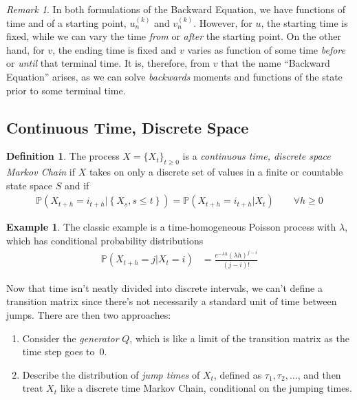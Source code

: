 \documentclass[12pt]{article}
\theoremstyle{plain}
\theoremstyle{definition}
\newtheorem{defn}[thm]{Definition}
\newtheorem{ex}[thm]{Example}
\theoremstyle{remark}
\newtheorem*{rmk}{Remark}
\begin{document}
\begin{rmk}
In both formulations of the Backward Equation, we have functions of time
and of a starting point, $u^{(k)}_n$ and $v^{(k)}_n$. However, for $u$,
the starting time is fixed, while we can vary the time \emph{from} or
\emph{after} the starting point. On the other hand, for $v$, the ending
time is fixed and $v$ varies as function of some time \emph{before} or
\emph{until} that terminal time. It is, therefore, from $v$ that the
name ``Backward Equation'' arises, as we can solve \emph{backwards}
moments and functions of the state prior to some terminal time.
\end{rmk}

\subsection{Continuous Time, Discrete Space}

\begin{defn}
The process $X=\{X_t\}_{t\geq 0}$ is a \emph{continuous time, discrete
space Markov Chain} if $X$ takes on only a discrete set of values in a
finite or countable state space $S$ and if
\begin{align*}
  \mathbb{P}\left(X_{t+h} = i_{t+h} | \left\{ X_{s}, s\leq t\right\}\right)
  =
  \mathbb{P}(X_{t+h} = i_{t+h} | X_{t} )
  \qquad \forall h \geq 0
\end{align*}
\end{defn}
\begin{ex}
The classic example is a time-homogeneous Poisson process with
$\lambda$, which has conditional probability distributions
\begin{align*}
  \mathbb{P}(X_{t+h}=j|X_t=i)
  &=
  \frac{e^{-\lambda h}(\lambda h)^{j-i}}{(j-i)!}
\end{align*}
\end{ex}

Now that time isn't neatly divided into discrete intervals, we can't
define a transition matrix since there's not necessarily a standard unit
of time between jumps. There are then two approaches:
\begin{enumerate}
  \item Consider the \emph{generator} $Q$, which is like a limit of the
    transition matrix as the time step goes to~0.
  \item Describe the distribution of \emph{jump times} of $X_t$, defined
    as $\tau_1, \tau_2,\ldots$, and then treat $X_t$ like a discrete
    time Markov Chain, conditional on the jumping times.
\end{enumerate}
\end{document}
